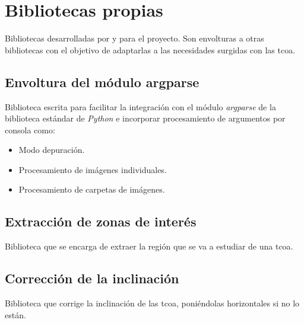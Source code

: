 \section{Bibliotecas propias}

Bibliotecas desarrolladas por y para el proyecto. Son envolturas a
otras bibliotecas con el objetivo de adaptarlas a las necesidades
surgidas con las \gls{tcoa}.

\subsection{Envoltura del módulo argparse}
Biblioteca escrita para facilitar la integración con el módulo
\emph{argparse} de la biblioteca estándar de \emph{Python} e incorporar
procesamiento de argumentos por consola como:
\begin{itemize}
\item Modo depuración.
\item Procesamiento de imágenes individuales.
\item Procesamiento de carpetas de imágenes.
\end{itemize}

\subsection{Extracción de zonas de interés}
Biblioteca que se encarga de extraer la región que se va a estudiar
de una \gls{tcoa}.

\subsection{Corrección de la inclinación}
Biblioteca que corrige la inclinación de las \gls{tcoa}, poniéndolas
horizontales si no lo están.